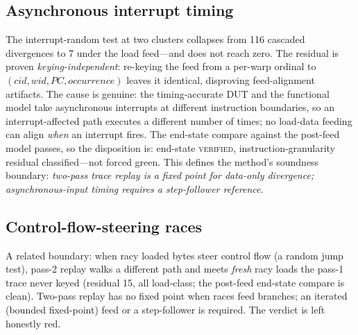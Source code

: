 \documentclass[conference]{IEEEtran}
\begin{document}
\subsection{Asynchronous interrupt timing}
The interrupt-random test at two clusters collapses from 116 cascaded
divergences to 7 under the load feed---and does not reach zero. The
residual is proven \emph{keying-independent}: re-keying the feed from a
per-warp ordinal to $(\textit{cid},\textit{wid},\textit{PC},
\textit{occurrence})$ leaves it identical, disproving feed-alignment
artifacts. The cause is genuine: the timing-accurate DUT and the
functional model take asynchronous interrupts at different instruction
boundaries, so an interrupt-affected path executes a different number
of times; no load-data feeding can align \emph{when} an interrupt
fires. The end-state compare against the post-feed model passes, so the
disposition is: end-state \textsc{verified}, instruction-granularity
residual classified---not forced green. This defines the method's
soundness boundary: \emph{two-pass trace replay is a fixed point for
data-only divergence; asynchronous-input timing requires a
step-follower reference}.

\subsection{Control-flow-steering races}
A related boundary: when racy loaded bytes steer control flow (a random
jump test), pass-2 replay walks a different path and meets \emph{fresh}
racy loads the pass-1 trace never keyed (residual 15, all load-class;
the post-feed end-state compare is clean). Two-pass replay has no fixed
point when races feed branches; an iterated (bounded fixed-point) feed
or a step-follower is required. The verdict is left honestly red.
\end{document}
